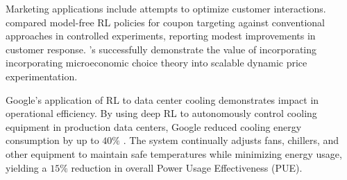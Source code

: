 Marketing applications include attempts to optimize customer interactions. \citet{Liu2022} compared model-free RL policies for coupon targeting against conventional approaches in controlled experiments, reporting modest improvements in customer response. \citet{Misra2019}'s successfully demonstrate the value of incorporating incorporating microeconomic choice theory into scalable dynamic price experimentation. 

Google's application of RL to data center cooling demonstrates impact in operational efficiency. By using deep RL to autonomously control cooling equipment in production data centers, Google reduced cooling energy consumption by up to $40\%$ \citep{Google2018}. The system continually adjusts fans, chillers, and other equipment to maintain safe temperatures while minimizing energy usage, yielding a $15\%$ reduction in overall Power Usage Effectiveness (PUE).